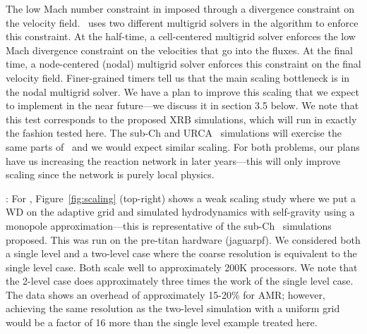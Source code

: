 \documentclass[11pt,letterpaper,english]{article}
\begin{document}
The low Mach number constraint in imposed through a divergence
constraint on the velocity field.
\maestro\ uses two different multigrid solvers in the algorithm to
enforce this constraint.  At
the half-time, a cell-centered multigrid solver enforces the low Mach
divergence constraint on the velocities that go into the fluxes.  At
the final time, a node-centered (nodal) multigrid solver enforces
this constraint on the final velocity field.
Finer-grained timers tell us that the main scaling bottleneck is in
the nodal multigrid solver.  We have a plan to improve this scaling
that we expect to implement in the near future---we discuss it 
in section 3.5 below.  We note that this test corresponds to the 
proposed XRB simulations, which will run in exactly the fashion
tested here.  The sub-Ch and URCA \maestro\ simulations will exercise the
same parts of \maestro\ and we would expect similar scaling.  For
both problems, our plans have us increasing the reaction network in
later years---this will only improve scaling since the network is purely
local physics.

{\bf \castro}: For \castro, Figure~\ref{fig:scaling} (top-right) shows a
weak scaling study where we put a WD on the adaptive grid and
simulated hydrodynamics with self-gravity using a monopole
approximation---this is representative of the sub-Ch
\castro\ simulations proposed.  This was run on the pre-titan hardware
(jaguarpf).  We considered both a single level and a two-level case
where the coarse resolution is equivalent to the single level case.
Both scale well to approximately 200K processors.  We note that the
2-level case does approximately three times the work of the single
level case.  The data shows an overhead of approximately 15-20\% for
AMR; however, achieving the same resolution as the two-level
simulation with a uniform grid would be a factor of 16 more than the
single level example treated here.
\end{document}
